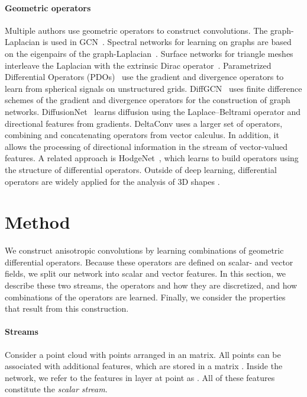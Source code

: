 \documentclass[acmtog, authorversion]{acmart}
\begin{document}
\paragraph*{Geometric operators} 
Multiple authors use geometric operators to construct convolutions. The graph-Laplacian is used in GCN~\cite{kipf2017}. Spectral networks for learning on graphs are based on the eigenpairs of the graph-Laplacian~\cite{Bruna2013}. 
Surface networks for triangle meshes~\cite{Kostrikov2018} interleave the Laplacian with the extrinsic Dirac operator~\cite{liu2017dirac}.
Parametrized Differential Operators (PDOs)~\cite{jiang2018spherical} use the gradient and divergence operators to learn from spherical signals on unstructured grids.
DiffGCN~\cite{Eliasof2020} uses finite difference schemes of the gradient and divergence operators for the construction of graph networks.
DiffusionNet~\cite{Sharp2020DiffusionIA} learns diffusion using the Laplace--Beltrami operator and directional features from gradients. DeltaConv uses a larger set of operators, combining and concatenating operators from vector calculus. In addition, it allows the processing of directional information in the stream of vector-valued features. A related approach is HodgeNet~\cite{smirnov2021hodgenet}, which learns to build operators using the structure of differential operators.
Outside of deep learning, differential operators are widely applied for the analysis of 3D shapes \cite{Crane2013DGP,Goes2015}.
 \section{Method}
We construct anisotropic convolutions by learning combinations of geometric differential operators. Because these operators are defined on scalar- and vector fields, we split our network into scalar and vector features. In this section, we describe these two streams, the operators and how they are discretized, and how combinations of the operators are learned. Finally, we consider the properties that result from this construction.

\paragraph*{Streams} Consider a point cloud  with  points arranged in an  matrix. All points can be associated with  additional features, which are stored in a matrix . Inside the network, we refer to the features in layer  at point  as . All of these features constitute the \textit{scalar stream}.
\end{document}
